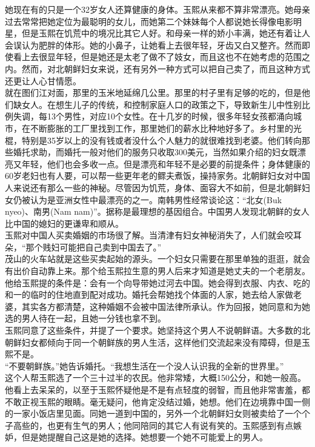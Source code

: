 \begin{multicols}{\theparacolNo}
她现在有的只是一个32岁女人还算健康的身体。玉熙从来都不算非常漂亮。她母亲过去常常把她定位为最聪明的女儿，而她第二个妹妹每个人都说她长得像电影明星，但是玉熙在饥荒中的境况比其它人好。和母亲一样的娇小丰满，她还有着让人会误认为肥胖的体形。她的小鼻子，让她看上去很年轻，牙齿又白又整齐。然而即使看上去很显年轻，但是她还是太老了做不了妓女，而且这也不在她考虑的范围之内。然而，对北朝鲜妇女来说，还有另外一种方式可以把自己卖了，而且这种方式还更让人心甘情愿。\\

就在图们江对面，那里的玉米地延绵几公里。那里的村子里有足够的吃的，但是他们缺女人。在想生儿子的传统，和控制家庭人口的政策之下，导致新生儿中性别比例失调，每13个男性，对应10个女性。在十几岁的时候，很多年轻女孩都涌向城市，在不断膨胀的工厂里找到工作，那里她们的薪水比种地好多了。乡村里的光棍，特别是35岁以上的没有钱或者没什么个人魅力的就很难找到老婆。他们转向那些婚托求助，而婚托一般对他们的服务只收取300美元，当然如果介绍的妇女既漂亮又年轻，他们也会多收一点。但是漂亮和年轻不是必要的前提条件；身体健康的60岁老妇也有人要，可以帮一些更年老的鳏夫煮饭，操持家务。北朝鲜妇女对中国人来说还有那么一些的神秘。尽管因为饥荒，身体、面容大不如前，但是北朝鲜妇女仍被认为是亚洲女性中最漂亮的之一。南韩男性经常谈论这：“北女(Buk nyeo)、南男(Nam nam)”。据称是最理想的基因组合。中国男人发现北朝鲜的女人比中国的媳妇的更谦卑和顺从。\\

玉熙对中国人买卖婚姻的市场很了解。当清津有妇女神秘消失了，人们就会咬耳朵，“那个贱妇可能把自己卖到中国去了。”\\

茂山的火车站就是这些买卖起始的源头。一个妇女只需要在那里单独的逛逛，就会有出价自动靠上来。那个给玉熙拉生意的男人后来才知道是她丈夫的一个老朋友。他给玉熙提的条件是：会有一个向导带她过河去中国。她会得到衣服、内衣、吃的和一的临时的住地直到配对成功。婚托会帮她找个体面的人家，她去给人家做老婆，其实各方都清楚，这种婚姻不会被中国法律所承认。作为回报，她同意和为她选的男人待在一起，且她一分钱也拿不到。\\

玉熙同意了这些条件，并提了一个要求。她坚持这个男人不说朝鲜语。大多数的北朝鲜妇女都倾向于同一个朝鲜族的男人生活，这样他们交流起来没有障碍，但是玉熙不是。\\

“不要朝鲜族。”她告诉婚托。“我想生活在一个没人认识我的全新的世界里。”\\

这个人帮玉熙选了一个三十过半的农民。他非常矮，大概150公分，和她一般高。他看上去呆呆的，以至于玉熙怀疑他是不是有点轻度的弱智，而且他非常害羞，都不敢正视玉熙的眼睛。毫无疑问，他肯定没结过婚，她想。他们在边境靠中国一侧的一家小饭店里见面。同她一道到中国的，另外一个北朝鲜妇女则被卖给了一个个子高些的，也更有生气的男人；他同陪同的其它人有说有笑的。玉熙感到有点嫉妒，但是她提醒自己这是她的选择。她想要一个她不可能爱上的男人。\\


\end{multicols}
